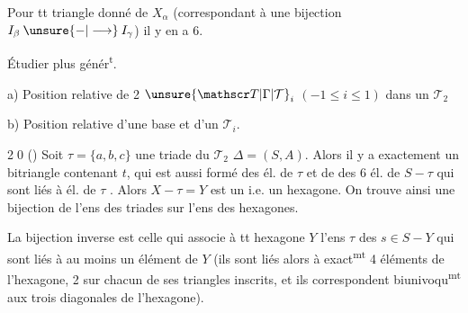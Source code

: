 
Pour tt triangle donné de $X_\alpha$ (correspondant à une bijection $I_\beta\mathbin{\unsure{-|\longrightarrow}}I_\gamma$) il y en a 6.

\begin{center}\end{center}

Étudier plus génér\textsuperscript{t}.

a) Position relative de 2 $\unsure{\mathscr T|\Gamma|\mathcal T}_i$ $(-1\le i\le1)$ dans un $\mathscr T_2$

b) Position relative d'une base et d'un $\mathscr T_i$.

\textcircled{20} () Soit $\tau=\{a,b,c\}$ une triade du $\mathscr T_2$ $\Delta=(S,A)$. Alors  il y a exactement un bitriangle contenant $t$, qui est aussi formé des él. de $\tau$ et de  des 6 él. de $S-\tau$ qui sont liés à     él. de $\tau$ .
Alors $X-\tau=Y$ est un   i.e. un hexagone. On trouve ainsi une bijection de l'ens des triades sur l'ens des hexagones.


La bijection inverse est celle qui associe à tt hexagone $Y$ l'ens $\tau$ des $s\in S-Y$ qui sont liés à au moins un élément de $Y$ (ils sont liés alors à exact\textsuperscript{mt} 4 éléments  de l'hexagone, 2 sur chacun de ses triangles inscrits, et ils correspondent biunivoqu\textsuperscript{mt} aux trois diagonales de l'hexagone).

